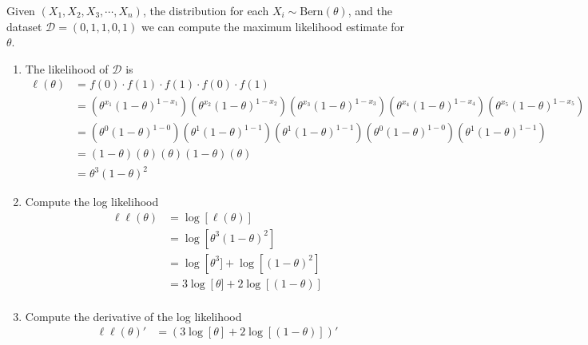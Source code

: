 \ex Given $(X_{1},X_{2},X_{3}, \cdots, X_{n})$, the distribution for each $X_{i} \sim \text{Bern}(\theta)$, and the dataset $\mathcal{D} = (0,1,1,0,1)$ we can compute the maximum likelihood estimate for $\theta$. 
\begin{enumerate}
    \item The likelihood of $\mathcal{D}$ is
    \begin{align*}
        \ell(\theta) &= f(0) \cdot f(1) \cdot f(1) \cdot f(0) \cdot f(1)\\
                     &= \left(\theta^{x_{1}} (1-\theta)^{1-x_{1}}\right)
                        \left(\theta^{x_{2}} (1-\theta)^{1-x_{2}}\right)
                        \left(\theta^{x_{3}} (1-\theta)^{1-x_{3}}\right)
                        \left(\theta^{x_{4}} (1-\theta)^{1-x_{4}}\right)
                        \left(\theta^{x_{5}} (1-\theta)^{1-x_{5}}\right)\\
                    &=  \left(\theta^{0} (1-\theta)^{1-0}\right)
                        \left(\theta^{1} (1-\theta)^{1-1}\right)
                        \left(\theta^{1} (1-\theta)^{1-1}\right)
                        \left(\theta^{0} (1-\theta)^{1-0}\right)
                        \left(\theta^{1} (1-\theta)^{1-1}\right)\\
                    &=  \left( 1-\theta \right)
                        \left(\theta \right)
                        \left(\theta \right)
                        \left( 1-\theta\right)
                        \left(\theta \right)\\
                    &=  \theta^{3} (1-\theta)^{2}
    \end{align*} 
    \item Compute the log likelihood
    \begin{align*}
        \ell \ell (\theta) &= \log \left[ \ell(\theta)  \right] \\ 
                           &= \log \left[ \theta^{3} (1-\theta)^{2} \right] \\ 
                           &= \log \left[ \theta^{3}] + \log \left[ (1-\theta)^{2} \right] \\ 
                           &= 3 \log \left[\theta] + 2 \log \left[ (1-\theta)\right] \\ 
    \end{align*}
    \item Compute the derivative of the log likelihood 
    \begin{align*}
        \ell \ell (\theta)'  &= \left( 3 \log [\theta] + 2 \log [ (1-\theta)] \right)' \\ 

\end{align*}
\end{enumerate}
